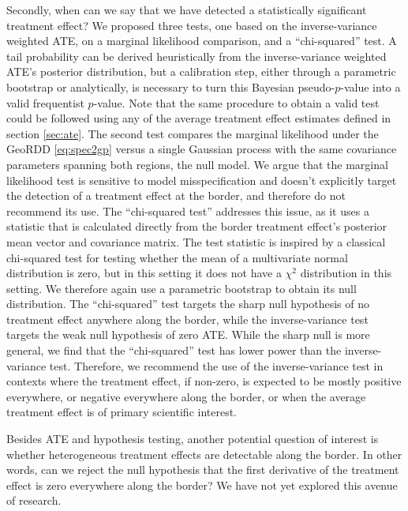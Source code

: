\documentclass[letter]{article}
\begin{document}
Secondly, when can we say that we have detected a statistically significant treatment effect?
We proposed three tests, one based on the inverse-variance weighted ATE, on a marginal likelihood comparison, and a ``chi-squared'' test.
A tail probability can be derived heuristically from the inverse-variance weighted ATE's posterior distribution, but a calibration step, either through a parametric bootstrap or analytically, is necessary to turn this Bayesian pseudo-\(p\)-value into a valid frequentist \(p\)-value.
Note that the same procedure to obtain a valid test could be followed using any of the average treatment effect estimates defined in section \ref{sec:ate}.
The second test compares the marginal likelihood under the GeoRDD \eqref{eq:spec2gp} versus a single Gaussian process with the same covariance parameters spanning both regions, the null model.
We argue that the marginal likelihood test is sensitive to model misspecification and doesn't explicitly target the detection of a treatment effect at the border, and therefore do not recommend its use.
The ``chi-squared test'' addresses this issue, as it uses a statistic that is calculated directly from the border treatment effect's posterior mean vector and covariance matrix.
The test statistic is inspired by a classical chi-squared test for testing whether the mean of a multivariate normal distribution is zero, but in this setting it does not have a \(\chi^2\) distribution in this setting.
We therefore again use a parametric bootstrap to obtain its null distribution.
The ``chi-squared'' test targets the sharp null hypothesis of no treatment effect anywhere along the border, while the inverse-variance test targets the weak null hypothesis of zero ATE.
While the sharp null is more general, we find that the ``chi-squared'' test has lower power than the inverse-variance test.
Therefore, we recommend the use of the inverse-variance test in contexts where the treatment effect, if non-zero, is expected to be mostly positive everywhere, or negative everywhere along the border, or when the average treatment effect is of primary scientific interest.

Besides ATE and hypothesis testing, another potential question of interest is whether heterogeneous treatment effects are detectable along the border.
In other words, can we reject the null hypothesis that the first derivative of the treatment effect is zero everywhere along the border?
We have not yet explored this avenue of research.
    
\end{document}
